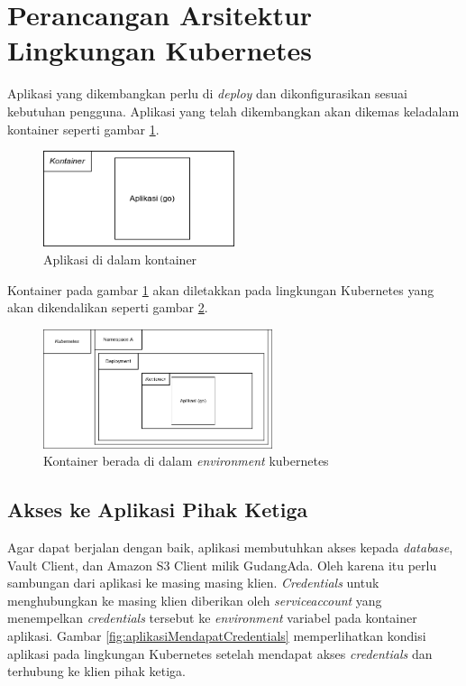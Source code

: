 \section{Perancangan Arsitektur Lingkungan Kubernetes}
\label{sec:perancanganEnvironment}
Aplikasi yang dikembangkan perlu di \textit{deploy} dan dikonfigurasikan sesuai kebutuhan pengguna. Aplikasi yang telah dikembangkan akan dikemas keladalam kontainer seperti gambar \ref{fig:aplikasiDiDalamKontainer}. 

\begin{figure}
	\centering
	\includegraphics[width=0.5\textwidth]{pics/AplikasiDalamKontainer.png}
	\caption{Aplikasi di dalam kontainer}
	\label{fig:aplikasiDiDalamKontainer}
\end{figure}

Kontainer pada gambar \ref{fig:aplikasiDiDalamKontainer} akan diletakkan pada lingkungan Kubernetes yang akan dikendalikan seperti gambar \ref{fig:aplikasiDiDalamKubernetes}. 
\begin{figure}
	\centering
	\includegraphics[width=0.6\textwidth]{pics/AplikasiDalamKubernetes.png}
	\caption{Kontainer berada di dalam \textit{environment} kubernetes}
	\label{fig:aplikasiDiDalamKubernetes}
\end{figure}

\subsection{Akses ke Aplikasi Pihak Ketiga}
Agar dapat berjalan dengan baik, aplikasi membutuhkan akses kepada \textit{database}, Vault Client, dan Amazon S3 Client milik GudangAda. Oleh karena itu perlu sambungan dari aplikasi ke masing masing klien. \textit{Credentials} untuk menghubungkan ke masing klien diberikan oleh \textit{serviceaccount} yang menempelkan \textit{credentials} tersebut ke \textit{environment} variabel pada kontainer aplikasi. Gambar \ref{fig:aplikasiMendapatCredentials} memperlihatkan kondisi aplikasi pada lingkungan Kubernetes setelah mendapat akses \textit{credentials} dan terhubung ke klien pihak ketiga.

